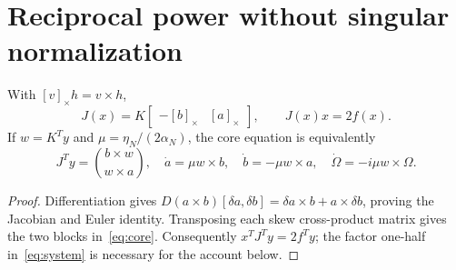 \section{Reciprocal power without singular normalization}\label{sec:power}
\begin{proposition}\label{prop:euler}
With $[v]_\times h=v\times h$,
\begin{equation}\label{eq:jacobian}
 J(x)=K\begin{bmatrix}-[b]_\times&[a]_\times\end{bmatrix},\qquad J(x)x=2f(x).
\end{equation}
If $w=K^Ty$ and $\mu=\eta_N/(2\alpha_N)$, the core equation is equivalently
\begin{equation}\label{eq:core}
 J^Ty=\binom{b\times w}{w\times a},\quad
 \dot a=\mu w\times b,\quad \dot b=-\mu w\times a,\quad
 \dot\Omega=-i\mu w\times\Omega.
\end{equation}
\end{proposition}
\begin{proof}
Differentiation gives $D(a\times b)[\delta a,\delta b]=\delta a\times b+a\times\delta b$, proving the Jacobian and Euler identity. Transposing each skew cross-product matrix gives the two blocks in~\eqref{eq:core}. Consequently $x^TJ^Ty=2f^Ty$; the factor one-half in~\eqref{eq:system} is necessary for the account below.
\end{proof}

